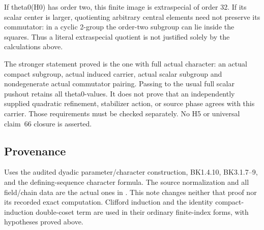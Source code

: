 If theta0(H0) has order two, this finite image is extraspecial of order
32. If its scalar center is larger, quotienting arbitrary central
elements need not preserve its commutator: in a cyclic 2-group the
order-two subgroup can lie inside the squares. Thus a literal
extraspecial quotient is not justified solely by the calculations above.

The stronger statement proved is the one with full actual character: an
actual compact subgroup, actual induced carrier, actual scalar subgroup
and nondegenerate actual commutator pairing. Passing to the usual full
scalar pushout retains all theta0-values. It does not prove that an
independently supplied quadratic refinement, stabilizer action, or
source phase agrees with this carrier. Those requirements must be
checked separately. No H5 or universal claim~66 closure is asserted.

\hypertarget{rank~4-provenance}{%
\subsection{Provenance}\label{rank~4-provenance}}

Uses the audited dyadic parameter/character construction, BK1.4.10,
BK3.1.7--9, and the defining-sequence character formula. The source
normalization and all field/chain data are the actual ones in
. This note changes neither that
proof nor its recorded exact computation. Clifford induction and the
identity compact-induction double-coset term are used in their ordinary
finite-index forms, with hypotheses proved above.
